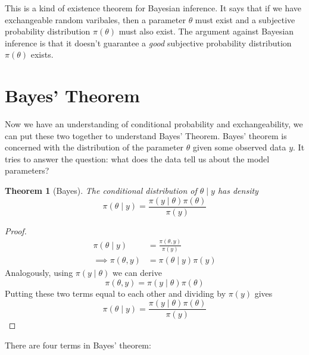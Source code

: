 \documentclass[
]{book}
\newtheorem{theorem}{Theorem}[chapter]
\theoremstyle{definition}
\theoremstyle{definition}
\theoremstyle{definition}
\theoremstyle{definition}
\theoremstyle{remark}
\begin{document}
This is a kind of existence theorem for Bayesian inference. It says that if we have exchangeable random varibales, then a parameter \(\theta\) must exist and a subjective probability distribution \(\pi(\theta)\) must also exist. The argument against Bayesian inference is that it doesn't guarantee a \emph{good} subjective probability distribution \(\pi(\theta)\) exists.

\section{Bayes' Theorem}\label{bayes-theorem}

Now we have an understanding of conditional probability and exchangeability, we can put these two together to understand Bayes' Theorem. Bayes' theorem is concerned with the distribution of the parameter \(\theta\) given some observed data \(y\). It tries to answer the question: what does the data tell us about the model parameters?

\begin{theorem}[Bayes]
The conditional distribution of \(\theta\mid y\) has density
\[
\pi(\theta \mid y) = \frac{\pi(y \mid \theta)\pi(\theta)}{\pi(y)}
\]
\end{theorem}

\begin{proof}
\begin{align}
\pi(\theta \mid y) &= \frac{\pi(\theta, y)}{\pi(y)}\\
\implies \pi(\theta, y) &= \pi(\theta \mid y)\pi(y)
\end{align}
Analogously, using \(\pi(y \mid \theta)\) we can derive
\[
\pi(\theta, y) = \pi(y \mid \theta)\pi(\theta)
\]
Putting these two terms equal to each other and dividing by \(\pi(y)\) gives
\[
\pi(\theta \mid y) = \frac{\pi(y \mid \theta)\pi(\theta)}{\pi(y)}
\]
\end{proof}

There are four terms in Bayes' theorem:
\end{document}
